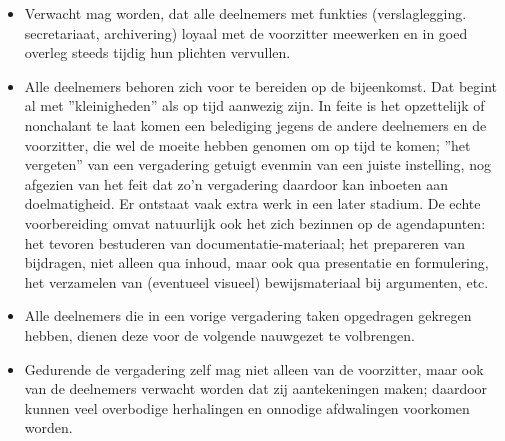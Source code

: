 \begin{itemize}
\item    Verwacht mag worden, dat alle deelnemers met funkties
     (verslaglegging. secretariaat, archi\-ve\-ring) loyaal met de
     voorzitter meewerken en in goed overleg steeds tijdig hun
     plichten vervullen.
\item    Alle deelnemers behoren zich voor te bereiden op de bijeenkomst.
         Dat begint al met ''kleinigheden'' als op tijd aanwezig zijn. In feite is het opzettelijk of nonchalant
          te laat komen een bele\-di\-ging jegens de andere deelnemers en de voorzitter, die wel de moeite hebben
          genomen om op tijd te komen; ''het vergeten'' van een
          vergadering getuigt evenmin van een juiste instelling, nog afgezien van het feit dat zo'n vergadering
          daardoor kan inboeten aan doelmatigheid. Er ontstaat
          vaak extra werk in een later stadium.
         De echte voorbereiding omvat natuurlijk ook het zich
          bezinnen op de agendapunten: het tevoren bestuderen
          van documentatie-materiaal; het prepareren van bijdragen, niet alleen qua inhoud, maar ook qua presentatie en formulering, het verzamelen van (eventueel
          visueel) bewijsmateriaal bij argumenten, etc.
\item    Alle deelnemers die in een vorige vergadering taken
          opgedragen gekregen hebben, dienen deze voor de
          volgende nauwgezet te volbrengen.
\item    Gedurende de vergadering zelf mag niet alleen van de
     voorzitter, maar ook van de deelnemers verwacht worden
     dat zij aantekeningen maken; daardoor kunnen veel overbodige herhalingen en onnodige afdwalingen voorkomen worden.


\end{itemize}
